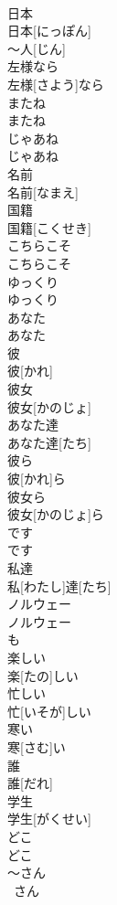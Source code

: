 \documentclass[8pt]{extreport}
\begin{document}
\begin{CJK}{UTF8}{min}
\\	日本	
\\	日本[にっぽん]
\\	～人[じん]
\\	左様なら	
\\	左様[さよう]なら
\\	またね	
\\	またね
\\	じゃあね	
\\	じゃあね
\\	名前	
\\	名前[なまえ]
\\	国籍	
\\	国籍[こくせき]
\\	こちらこそ	
\\	こちらこそ
\\	ゆっくり	
\\	ゆっくり
\\	あなた	
\\	あなた
\\	彼	
\\	彼[かれ]
\\	彼女	
\\	彼女[かのじょ]
\\	あなた達	
\\	あなた達[たち]
\\	彼ら	
\\	彼[かれ]ら
\\	彼女ら	
\\	彼女[かのじょ]ら
\\	です	
\\	です
\\	私達	
\\	私[わたし]達[たち]
\\	ノルウェー	
\\	ノルウェー
\\	も
\\	楽しい	
\\	楽[たの]しい
\\	忙しい	
\\	忙[いそが]しい
\\	寒い	
\\	寒[さむ]い
\\	誰	
\\	誰[だれ]
\\	学生	
\\	学生[がくせい]
\\	どこ	
\\	どこ
\\	～さん	
\\	~さん

\end{CJK}
\end{document}
